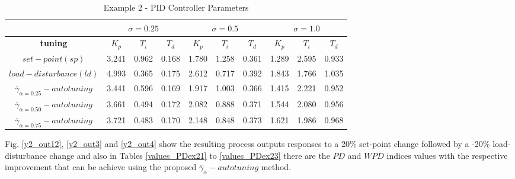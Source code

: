 \begin{table}[htb!]
\caption{Example 2 - PID Controller Parameters}
\label{PID_parameters2} \centering
\begin{tabular}{c|ccc|ccc|ccc}
\hline  & \multicolumn{3}{c}{$\sigma=0.25$} \vline &
\multicolumn{3}{c}{$\sigma=0.5$} \vline &
\multicolumn{3}{c}{$\sigma=1.0$} \\ \hline
\textbf{tuning}                              & $K_p$ & $T_i$ & $T_d$ & $K_p$ & $T_i$ & $T_d$ & $K_p$ & $T_i$ & $T_d$\\
\hline
$set-point(sp)$                              & 3.241 & 0.962 & 0.168 & 1.780 & 1.258 & 0.361 & 1.289 & 2.595 & 0.933\\
$load-disturbance(ld)$                       & 4.993 & 0.365 & 0.175 & 2.612 & 0.717 & 0.392 & 1.843 & 1.766 & 1.035\\
\hline
$\overline{\gamma}_{\alpha=0.25}-autotuning$ & 3.441 & 0.596 & 0.169 & 1.917 & 1.003 & 0.366 & 1.415 & 2.221 & 0.952\\
$\overline{\gamma}_{\alpha=0.50}-autotuning$ & 3.661 & 0.494 & 0.172 & 2.082 & 0.888 & 0.371 & 1.544 & 2.080 & 0.956\\
$\overline{\gamma}_{\alpha=0.75}-autotuning$ & 3.721 & 0.483 & 0.170 & 2.148 & 0.848 & 0.373 & 1.621 & 1.986 & 0.968\\
\hline
\end{tabular}
\end{table}



Fig. \ref{y2_out12}, \ref{y2_out3} and \ref{y2_out4} show the
resulting process outputs responses to a 20\% set-point change
followed by a -20\% load-disturbance change and also in Tables
\ref{values_PDex21} to \ref{values_PDex23} there are the
$\mathit{PD}$ and $\mathit{WPD}$ indices values with the
respective improvement that can be achieve using the proposed
$\overline{\gamma}_{\alpha}-autotuning$ method.

